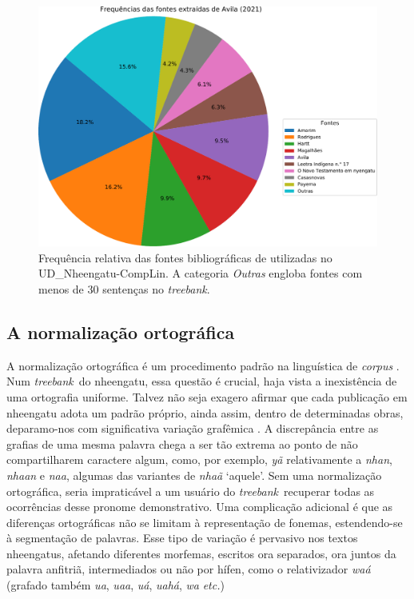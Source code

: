 \documentclass[portuguese]{textolivre}
\newcommand{\wt}[2]{\textit{#1} `#2'}
\newcommand{\tbc}{UD\_Nheengatu-CompLin}
\newcommand{\tb}{\textit{treebank}}
\begin{document}
\begin{figure}[htbp]
  \centering
  \begin{minipage}{.8\textwidth}
    \includegraphics[width=\linewidth]{figures/FreqSourcesAvila.pdf}
    \caption{Frequência relativa das fontes bibliográficas de \textcite{avila2021} utilizadas no \tbc. A categoria \textit{Outras} engloba fontes com menos de 30 sentenças no \tb.}
    \label{fig:freqsources-avila}
  \end{minipage}
\end{figure}

\subsection{A normalização ortográfica}\label{subsec:normal}

A normalização ortográfica é um procedimento padrão na linguística de \textit{corpus} \parencite{hirschmann2019korpuslinguistik}. Num \tb~do nheengatu, essa questão é crucial, haja vista a inexistência de uma ortografia uniforme. Talvez não seja exagero afirmar que cada publicação em nheengatu adota um padrão próprio, ainda assim, dentro de determinadas obras, deparamo-nos com significativa variação grafêmica \parencite{avila2021,DAngelis-2023}. A discrepância entre as grafias de uma mesma palavra chega a ser tão extrema ao ponto de não compartilharem caractere algum, como, por exemplo, \textit{yã} relativamente a \textit{nhan}, \textit{nhaan} e \textit{naa}, algumas das variantes de \wt{nhaã}{aquele}. Sem uma normalização ortográfica, seria impraticável a um usuário do \tb~recuperar todas as ocorrências desse pronome demonstrativo. Uma complicação adicional é que as diferenças ortográficas não se limitam à representação de fonemas, estendendo-se à segmentação de palavras. Esse tipo de variação é pervasivo nos textos nheengatus, afetando diferentes morfemas, escritos ora separados, ora juntos da palavra anfitriã, intermediados ou não por hífen, como o relativizador \textit{waá} (grafado também \textit{ua}, \textit{uaa}, \textit{uá}, \textit{uahá}, \textit{wa} 	\textit{etc.})
\end{document}
